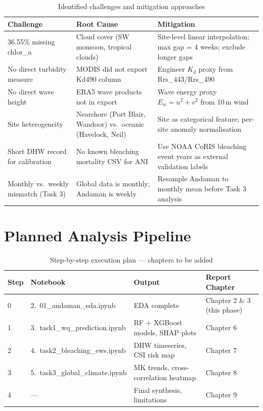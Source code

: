 \documentclass[12pt,a4paper]{report}
\begin{document}
\begin{table}[H]
\centering
\caption{Identified challenges and mitigation approaches}
\begin{tabular}{L{4cm}L{4.5cm}L{5cm}}
\toprule
\textbf{Challenge} & \textbf{Root Cause} & \textbf{Mitigation} \\
\midrule
{}
36.55\% missing chlor\_a & Cloud cover (SW monsoon, tropical clouds) & Site-level linear interpolation; max gap = 4 weeks; exclude longer gaps \\
No direct turbidity measure & MODIS did not export Kd490 column & Engineer $K_d$ proxy from Rrs\_443/Rrs\_490 \\
No direct wave height & ERA5 wave products not in export & Wave energy proxy $E_w = u^2 + v^2$ from 10\,m wind \\
Site heterogeneity & Nearshore (Port Blair, Wandoor) vs.\ oceanic (Havelock, Neil) & Site as categorical feature; per-site anomaly normalisation \\
Short DHW record for calibration & No known bleaching mortality CSV for ANI & Use NOAA CoRIS bleaching event years as external validation labels \\
Monthly vs.\ weekly mismatch (Task 3) & Global data is monthly; Andaman is weekly & Resample Andaman to monthly mean before Task 3 analysis \\
\bottomrule
\end{tabular}
\label{tab:challenges}
\end{table}

\chapter{Planned Analysis Pipeline}

\begin{table}[H]
\centering
\caption{Step-by-step execution plan — chapters to be added}
\begin{tabular}{C{1cm}L{3.5cm}L{4cm}L{4cm}}
\toprule
\textbf{Step} & \textbf{Notebook} & \textbf{Output} & \textbf{Report Chapter} \\
\midrule
{}
0 & 2.\ 01\_andaman\_eda.ipynb & EDA complete & Chapter 2 \& 3 (this phase) \\
1 & 3.\ task1\_wq\_prediction.ipynb & RF + XGBoost models, SHAP plots & Chapter 6 \\
2 & 4.\ task2\_bleaching\_ews.ipynb & DHW timeseries, CSI risk map & Chapter 7 \\
3 & 5.\ task3\_global\_climate.ipynb & MK trends, cross-correlation heatmap & Chapter 8 \\
4 & --- & Final synthesis, limitations & Chapter 9 \\
\bottomrule
\end{tabular}
\label{tab:pipeline}
\end{table}
\end{document}
